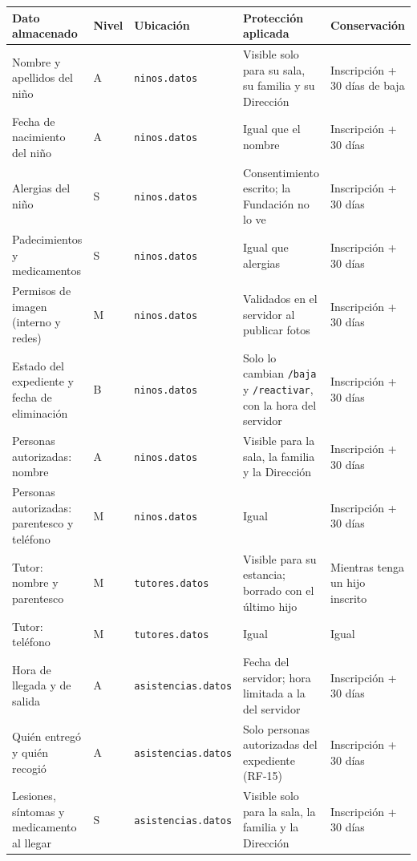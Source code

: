 {\small
\begin{longtable}{p{3.6cm}p{1.3cm}p{3.2cm}p{3.6cm}p{3.0cm}}
\toprule
\textbf{Dato almacenado} & \textbf{Nivel} & \textbf{Ubicación} & \textbf{Protección aplicada} & \textbf{Conservación}\\\midrule\endhead
Nombre y apellidos del niño & A & \texttt{ninos.\allowbreak{}datos} & Visible solo para su sala, su familia y su Dirección & Inscripción + 30 días de baja\\
Fecha de nacimiento del niño & A & \texttt{ninos.\allowbreak{}datos} & Igual que el nombre & Inscripción + 30 días\\
Alergias del niño & S & \texttt{ninos.\allowbreak{}datos} & Consentimiento escrito; la Fundación no lo ve & Inscripción + 30 días\\
Padecimientos y medicamentos & S & \texttt{ninos.\allowbreak{}datos} & Igual que alergias & Inscripción + 30 días\\
Permisos de imagen (interno y redes) & M & \texttt{ninos.\allowbreak{}datos} & Validados en el servidor al publicar fotos & Inscripción + 30 días\\
Estado del expediente y fecha de eliminación & B & \texttt{ninos.\allowbreak{}datos} & Solo lo cambian \texttt{/\allowbreak{}baja} y \texttt{/\allowbreak{}reactivar}, con la hora del servidor & Inscripción + 30 días\\
Personas autorizadas: nombre & A & \texttt{ninos.\allowbreak{}datos} & Visible para la sala, la familia y la Dirección & Inscripción + 30 días\\
Personas autorizadas: parentesco y teléfono & M & \texttt{ninos.\allowbreak{}datos} & Igual & Inscripción + 30 días\\
Tutor: nombre y parentesco & M & \texttt{tutores.\allowbreak{}datos} & Visible para su estancia; borrado con el último hijo & Mientras tenga un hijo inscrito\\
Tutor: teléfono & M & \texttt{tutores.\allowbreak{}datos} & Igual & Igual\\
Hora de llegada y de salida & A & \texttt{asistencias.\allowbreak{}datos} & Fecha del servidor; hora limitada a la del servidor & Inscripción + 30 días\\
Quién entregó y quién recogió & A & \texttt{asistencias.\allowbreak{}datos} & Solo personas autorizadas del expediente (RF-15) & Inscripción + 30 días\\
Lesiones, síntomas y medicamento al llegar & S & \texttt{asistencias.\allowbreak{}datos} & Visible solo para la sala, la familia y la Dirección & Inscripción + 30 días\\

\end{longtable}}
